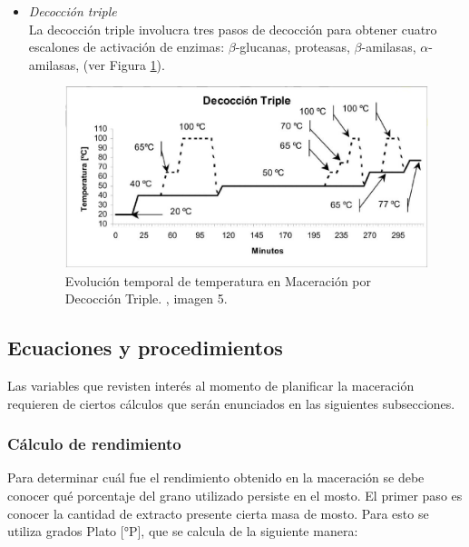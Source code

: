 \begin{itemize}
                    \item \textit{Decocción triple} \\ La decocción triple involucra tres pasos de decocción para obtener cuatro escalones de activación de enzimas: $\beta$-glucanas, proteasas, $\beta$-amilasas, $\alpha$-amilasas, (ver Figura \ref{MaceracionDecoccionTriple}).
                    
                    \begin{figure} [ht]		                                                          \centerline{\includegraphics[scale=0.5]{decoccion_triple.jpg}}
                        \caption{Evolución temporal de temperatura en Maceración por Decocción Triple. \cite{Ceresvis}, imagen 5.}
                        \label{MaceracionDecoccionTriple}
                    \end{figure}
                    
                \end{itemize}
        \hfill \break        
        \subsection{Ecuaciones y procedimientos}
            \label{EcuacionesyProcedimientos}
            \par Las variables que revisten interés al momento de planificar la maceración requieren de ciertos cálculos que serán enunciados en las siguientes subsecciones. 
            
            \subsubsection{Cálculo de rendimiento }
            \label{AT_CalculodeRendimiento}
                \par Para determinar cuál fue el rendimiento obtenido en la maceración se debe conocer qué porcentaje del grano utilizado persiste en el mosto. El primer paso es conocer la cantidad de extracto presente cierta masa de mosto. Para esto se utiliza grados Plato [°P], que se calcula de la siguiente manera:
                
